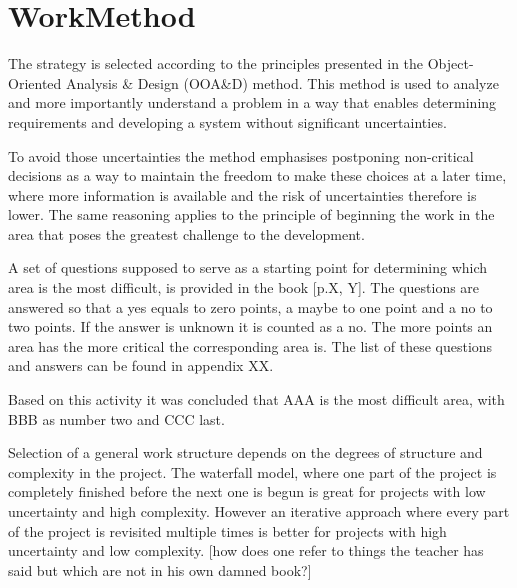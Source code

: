\section{WorkMethod}
The strategy is selected according to the principles presented in the Object-Oriented Analysis \& Design (OOA\&D) method.
This method is used to analyze and more importantly understand a problem in a way that enables determining requirements and developing a system without significant uncertainties.

To avoid those uncertainties the method emphasises postponing non-critical decisions as a way to maintain the freedom to make these choices at a later time, where more information is available and the risk of uncertainties therefore is lower.
The same reasoning applies to the principle of beginning the work in the area that poses the greatest challenge to the development.

A set of questions supposed to serve as a starting point for determining which area is the most difficult, is provided in the book [p.X, Y].
The questions are answered so that a yes equals to zero points, a maybe to one point and a no to two points. %
If the answer is unknown it is counted as a no. The more points an area has the more critical the corresponding area is. The list of these questions and answers can be found in appendix XX.

Based on this activity it was concluded that AAA is the most difficult area, with BBB as number two and CCC last.

Selection of a general work structure depends on the degrees of structure and complexity in the project. The waterfall model, where one part of the project is completely finished before the next one is begun is great for projects with low uncertainty and high complexity. However an iterative approach where every part of the project is revisited  multiple times is better for projects with high uncertainty and low complexity. [how does one refer to things the teacher has said but which are not in his own damned book?] %

